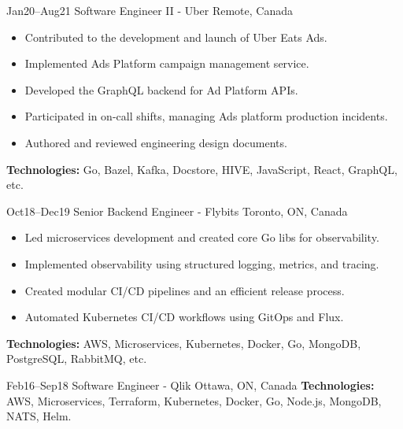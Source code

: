 \documentclass[]{cv-style}                     %
\begin{document}
\begin{entrylist}
  \entry
  {\small Jan20--Aug21}
  {Software Engineer II - Uber}
  {Remote, Canada}
  {
    \begin{itemize}
      \item Contributed to the development and launch of Uber Eats Ads.
      \item Implemented Ads Platform campaign management service.
      \item Developed the GraphQL backend for Ad Platform APIs.
      \item Participated in on-call shifts, managing Ads platform production incidents.
      \item Authored and reviewed engineering design documents.
    \end{itemize}
    \textbf{Technologies:} Go, Bazel, Kafka, Docstore, HIVE, JavaScript, React, GraphQL, etc.
  }

  \entry
  {\small Oct18--Dec19}
  {Senior Backend Engineer - Flybits}
  {Toronto, ON, Canada}
  {
    \begin{itemize}
      \item Led microservices development and created core Go libs for observability.
      \item Implemented observability using structured logging, metrics, and tracing.
      \item Created modular CI/CD pipelines and an efficient release process.
      \item Automated Kubernetes CI/CD workflows using GitOps and Flux.
    \end{itemize}
    \textbf{Technologies:} AWS, Microservices, Kubernetes, Docker, Go, MongoDB, PostgreSQL, RabbitMQ, etc.
  }

  \entry
  {\small Feb16--Sep18}
  {Software Engineer - Qlik}
  {Ottawa, ON, Canada}
  {
    \textbf{Technologies:} AWS, Microservices, Terraform, Kubernetes, Docker, Go, Node.js, MongoDB, NATS, Helm.
   }


\end{entrylist}
\end{document}

